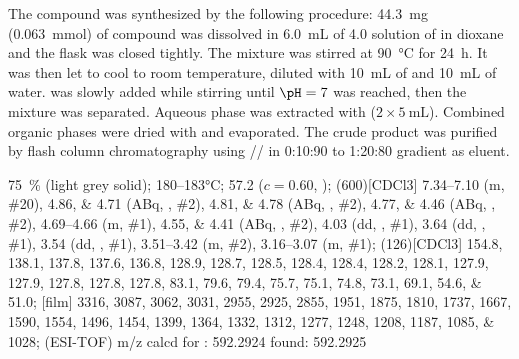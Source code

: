 The compound was synthesized by the following procedure:
\SI{44.3}{\milli\gram} (\SI{0.063}{\milli\mol}) of compound  was dissolved in \SI{6.0}{\milli\liter} of \SI{4.0}{\Molar} solution of  in dioxane and the flask was closed tightly.
The mixture was stirred at \SI{90}{\degreeCelsius} for \SI{24}{\hour}.
It was then let to cool to room temperature, diluted with \SI{10}{\milli\liter} of  and \SI{10}{\milli\liter} of water.
 was slowly added while stirring until $\pH = 7$ was reached, then the mixture was separated.
Aqueous phase was extracted with  ($2 \times \SI{5}{\milli\liter}$).
Combined organic phases were dried with  and evaporated.
The crude product was purified by flash column chromatography using // in 0:10:90 to 1:20:80 gradient as eluent.
\begin{fullexp}
	 \SI{75}{\percent} (light grey solid); 
	 \numrange{180}{183}\si{\celsius}; 
	\data{[$\alpha^{23}_D$]~$=$} \num{57.2} ($c = 0.60$, ); 
	\NMR(600)[CDCl3] \numrange{7.34}{7.10} (m, \#{20}), \numlist{4.86;4.71} (ABq, , \#{2}), \numlist{4.81;4.78} (ABq, , \#{2}), \numlist{4.77;4.46} (ABq, , \#{2}), \numrange{4.69}{4.66} (m, \#{1}), \numlist{4.55;4.41} (ABq, , \#{2}), \num{4.03} (dd, , \#{1}), \num{3.64} (dd, , \#{1}), \num{3.54} (dd, , \#{1}), \numrange{3.51}{3.42} (m, \#{2}), \numrange{3.16}{3.07} (m, \#{1}); 
	(126)[CDCl3] \numlist{154.8; 138.1; 137.8; 137.6; 136.8; 128.9; 128.7; 128.5; 128.4; 128.4; 128.2; 128.1; 127.9; 127.9; 127.8; 127.8; 127.8; 83.1; 79.6; 79.4; 75.7; 75.1; 74.8; 73.1; 69.1; 54.6; 51.0}; 
	[film] \numlist{3316; 3087; 3062; 3031; 2955; 2925; 2855; 1951; 1875; 1810; 1737; 1667; 1590; 1554; 1496; 1454; 1399; 1364; 1332; 1312; 1277; 1248; 1208; 1187; 1085; 1028}; 
	 (ESI-TOF) m/z calcd for : \num{592.2924} found: \num{592.2925}
\end{fullexp}
